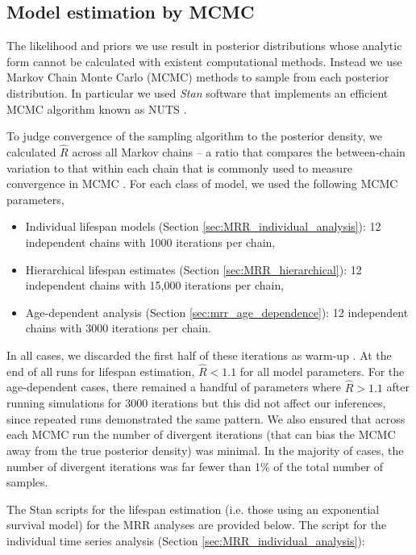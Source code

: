 \documentclass[12pt]{article}
\begin{document}
\subsection{Model estimation by MCMC}\label{sec:mrr_MCMC}
The likelihood and priors we use result in posterior distributions whose analytic form cannot be calculated with existent computational methods. Instead we use Markov Chain Monte Carlo (MCMC) methods to sample from each posterior distribution. In particular we used \textit{Stan} software \citep{carpenter2016stan} that implements an efficient MCMC algorithm known as NUTS \citep{hoffman2014no}.

To judge convergence of the sampling algorithm to the posterior density, we calculated $\hat{R}$ across all Markov chains -- a ratio that compares the between-chain variation to that within each chain that is commonly used to measure convergence in MCMC \citep{gelman1992inference}. For each class of model, we used the following MCMC parameters,
%
\begin{itemize}
	\item Individual lifespan models (Section \ref{sec:MRR_individual_analysis}): 12 independent chains with 1000 iterations per chain,
	\item Hierarchical lifespan estimates (Section \ref{sec:MRR_hierarchical}): 12 independent chains with 15,000 iterations per chain,
	\item Age-dependent analysis (Section \ref{sec:mrr_age_dependence}): 12 independent chains with 3000 iterations per chain.
\end{itemize}

In all cases, we discarded the first half of these iterations as warm-up \citep{gelman2014bayesian}. At the end of all runs for lifespan estimation, $\hat{R}<1.1$ for all model parameters. For the age-dependent cases, there remained a handful of parameters where $\hat{R}>1.1$ after running simulations for 3000 iterations but this did not affect our inferences, since repeated runs demonstrated the same pattern. We also ensured that across each MCMC run the number of divergent iterations (that can bias the MCMC away from the true posterior density) was minimal. In the majority of cases, the number of divergent iterations was far fewer than 1\% of the total number of samples.

The Stan scripts for the lifespan estimation (i.e. those using an exponential survival model) for the MRR analyses are provided below. The script for the individual time series analysis (Section \ref{sec:MRR_individual_analysis}):
\end{document}
